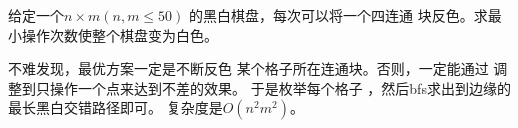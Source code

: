 \begin{prob}
	给定一个$n \times m(n,m \le 50)$
	的黑白棋盘，每次可以将一个四连通
	块反色。求最小操作次数使整个棋盘变为白色。
\end{prob}

\begin{sol}
	不难发现，最优方案一定是不断反色
	某个格子所在连通块。否则，一定能通过
	调整到只操作一个点来达到不差的效果。
	于是枚举每个格子
	，然后bfs求出到边缘的最长黑白交错路径即可。
	复杂度是$O(n^2m^2)$。
\end{sol}
